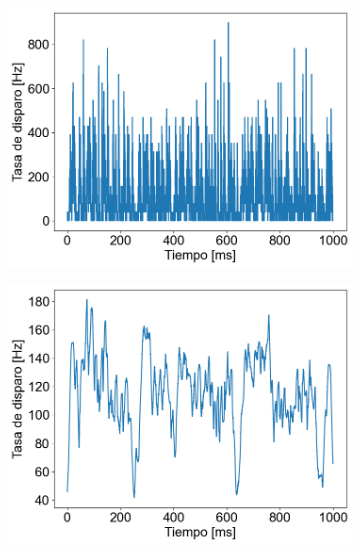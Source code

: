 \documentclass[aps,prb,twocolumn,superscriptaddress,floatfix,longbibliography]{revtex4-2}
\begin{document}
\begin{figure}[h]
  \centering
  \begin{subfigure}[b]{0.35\textwidth}
      \centering
      \includegraphics[width=\textwidth]{tasa_de_disparo_2.png}
      \caption{\label{fig:tasa_de_disparo_2}}
  \end{subfigure}
  \hfill
  \begin{subfigure}[b]{0.35\textwidth}
      \centering
      \includegraphics[width=\textwidth]{tasa_de_disparo_300.png}
      \caption{\label{fig:tasa_de_disparo_300}}
  \end{subfigure}
  \hfill
  \begin{subfigure}[b]{0.35\textwidth}
      \centering

\end{subfigure}
\end{figure}
\end{document}
